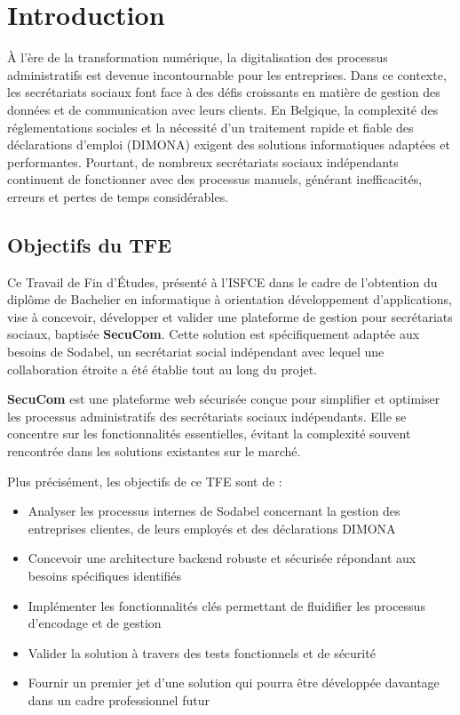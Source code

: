 \chapter{Introduction}

À l'ère de la transformation numérique, la digitalisation des processus administratifs est devenue incontournable pour les entreprises. Dans ce contexte, les secrétariats sociaux font face à des défis croissants en matière de gestion des données et de communication avec leurs clients. En Belgique, la complexité des réglementations sociales et la nécessité d'un traitement rapide et fiable des déclarations d'emploi (DIMONA) exigent des solutions informatiques adaptées et performantes. Pourtant, de nombreux secrétariats sociaux indépendants continuent de fonctionner avec des processus manuels, générant inefficacités, erreurs et pertes de temps considérables.

\section{Objectifs du TFE}

Ce Travail de Fin d'Études, présenté à l'ISFCE dans le cadre de l'obtention du diplôme de Bachelier en informatique à orientation développement d'applications, vise à concevoir, développer et valider une plateforme de gestion pour secrétariats sociaux, baptisée \textbf{SecuCom}. Cette solution est spécifiquement adaptée aux besoins de Sodabel, un secrétariat social indépendant avec lequel une collaboration étroite a été établie tout au long du projet.

\begin{infobox}
\textbf{SecuCom} est une plateforme web sécurisée conçue pour simplifier et optimiser les processus administratifs des secrétariats sociaux indépendants. Elle se concentre sur les fonctionnalités essentielles, évitant la complexité souvent rencontrée dans les solutions existantes sur le marché.
\end{infobox}

Plus précisément, les objectifs de ce TFE sont de :
\begin{itemize}
  \item Analyser les processus internes de Sodabel concernant la gestion des entreprises clientes, de leurs employés et des déclarations DIMONA
  \item Concevoir une architecture backend robuste et sécurisée répondant aux besoins spécifiques identifiés
  \item Implémenter les fonctionnalités clés permettant de fluidifier les processus d'encodage et de gestion
  \item Valider la solution à travers des tests fonctionnels et de sécurité
  \item Fournir un premier jet d'une solution qui pourra être développée davantage dans un cadre professionnel futur
\end{itemize}

